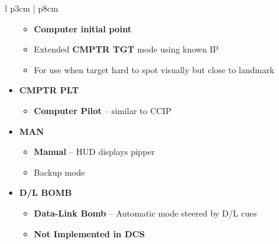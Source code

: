 \documentclass[8pt,usenames,dvipsnames,twoside]{article}
\begin{document}
\begin{center}
\begin{longtable}{l p{3cm} | p{8cm}}
\begin{minipage}[t]{\linewidth}
\begin{itemize}
\begin{itemize}
							\item \textbf{Computer initial point}
							\item Extended \textbf{CMPTR TGT} mode using known IP
							\item For use when target hard to spot visually but close to landmark
						\end{itemize}
						\item \textbf{CMPTR PLT}
						\begin{itemize}
							\item \textbf{Computer Pilot} -- similar to CCIP
						\end{itemize}
						\item \textbf{MAN}
						\begin{itemize}
							\item \textbf{Manual} -- HUD displays pipper
							\item Backup mode
						\end{itemize}
						\item \textbf{D/L BOMB}
						\begin{itemize}
							\item \textbf{Data-Link Bomb} -- Automatic mode steered by D/L cues
							\item \textbf{Not Implemented in DCS}
						\end{itemize}
					\end{itemize}
				\end{minipage} \\
				\bottomrule
			\end{longtable}
		\end{center}
		
	
\end{document}
